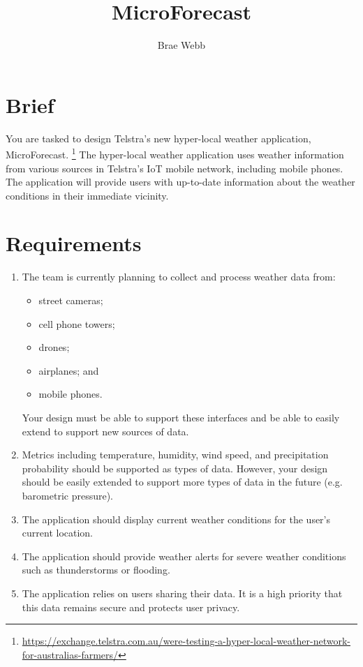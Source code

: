 \documentclass{csse4400}
\title{MicroForecast}
\author{Brae Webb}
\date{\week[tutorial]{3}}
\begin{document}
\maketitle

\section{Brief}

You are tasked to design Telstra's new hyper-local weather application, MicroForecast.%
\footnote{\url{https://exchange.telstra.com.au/were-testing-a-hyper-local-weather-network-for-australias-farmers/}}
The hyper-local weather application uses weather information from various sources in Telstra's IoT mobile network,
including mobile phones.
The application will provide users with up-to-date information about the weather conditions in their immediate vicinity.

\section{Requirements}

\begin{enumerate}
    \item The team is currently planning to collect and process weather data from:
        \begin{itemize}
            \item street cameras;
            \item cell phone towers;
            \item drones;
            \item airplanes; and
            \item mobile phones.
        \end{itemize}
        Your design must be able to support these interfaces and be able to easily extend to support new sources of data.
    \item Metrics including temperature, humidity, wind speed, and precipitation probability should be supported as types of data.
        However, your design should be easily extended to support more types of data in the future (e.g. barometric pressure).
    \item The application should display current weather conditions for the user's current location.
    \item The application should provide weather alerts for severe weather conditions such as thunderstorms or flooding.
    \item The application relies on users sharing their data. It is a high priority that this data remains secure and protects user privacy.
\end{enumerate}
\end{document}
